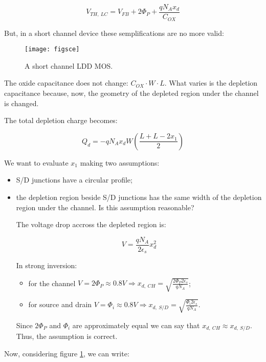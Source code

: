 \documentclass[a4paper, 12pt, twoside, openright]{report}
\begin{document}
	\begin{equation}
	V_{TH,\ LC} = V_{FB} + 2\Phi_P + \frac{q N_A x_d}{C_{OX}}
	\end{equation}

But, in a short channel device these semplifications are no more valid:

	\begin{figure}[H]
	\centering
	\texttt{[image: figsce]}
	\caption{A short channel LDD MOS.}
	\label{figsce}
	\end{figure}

The oxide capacitance does not change: $C_{OX} \cdot W \cdot L$. What varies is the depletion capacitance because, now, the geometry of the depleted region under the channel is changed.

The total depletion charge becomes:

\begin{equation}
Q_d = -q N_A x_d W \left( \frac{L + L - 2x_1}{2} \right)
\end{equation}

We want to evaluate $x_{1}$ making two assumptions:

	\begin{itemize}
	\item S/D junctions have a circular profile;
	\item the depletion region beside S/D junctions has the same width of the depletion region under the channel. Is this assumption reasonable?
	
	The voltage drop accross the depleted region is:
	
	\begin{equation}
	V = \frac{q N_A}{2 \epsilon_s} x_d^2
	\end{equation}
	
	In strong inversion:
		\begin{itemize}
		\item for the channel $V = 2\Phi_P \approx 0.8 V \Rightarrow x_{d,\ CH} = \sqrt{\frac{2 \Phi_P 2 \epsilon_s}{q N_A}}$;
		\item for source and drain $V = \Phi_i \approx 0.8 V \Rightarrow x_{d,\ S/D} = \sqrt{\frac{\Phi_i 2 \epsilon_s}{q N_A}}$.
		\end{itemize}
	
	Since $2\Phi_P$ and $\Phi_i$ are approximately equal we can say that $x_{d,\ CH} \approx x_{d,\ S/D}$. Thus, the assumption is correct.
	\end{itemize}

Now, considering figure \ref{figsce}, we can write:
\end{document}
